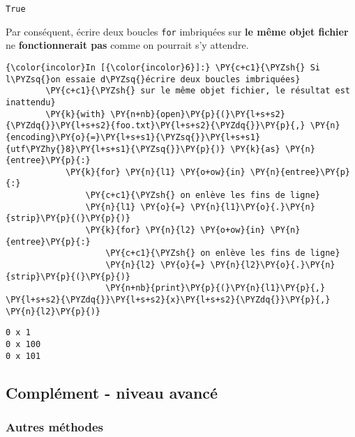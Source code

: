     \begin{Verbatim}[commandchars=\\\{\},frame=single,framerule=0.3mm,rulecolor=\color{cellframecolor}]
True
\end{Verbatim}

    Par conséquent, écrire deux boucles \texttt{for} imbriquées sur
\textbf{le même objet fichier} ne \textbf{fonctionnerait pas} comme on
pourrait s'y attendre.

    \begin{Verbatim}[commandchars=\\\{\},frame=single,framerule=0.3mm,rulecolor=\color{cellframecolor}]
{\color{incolor}In [{\color{incolor}6}]:} \PY{c+c1}{\PYZsh{} Si l\PYZsq{}on essaie d\PYZsq{}écrire deux boucles imbriquées}
        \PY{c+c1}{\PYZsh{} sur le même objet fichier, le résultat est inattendu}
        \PY{k}{with} \PY{n+nb}{open}\PY{p}{(}\PY{l+s+s2}{\PYZdq{}}\PY{l+s+s2}{foo.txt}\PY{l+s+s2}{\PYZdq{}}\PY{p}{,} \PY{n}{encoding}\PY{o}{=}\PY{l+s+s1}{\PYZsq{}}\PY{l+s+s1}{utf\PYZhy{}8}\PY{l+s+s1}{\PYZsq{}}\PY{p}{)} \PY{k}{as} \PY{n}{entree}\PY{p}{:}
            \PY{k}{for} \PY{n}{l1} \PY{o+ow}{in} \PY{n}{entree}\PY{p}{:}
                \PY{c+c1}{\PYZsh{} on enlève les fins de ligne}
                \PY{n}{l1} \PY{o}{=} \PY{n}{l1}\PY{o}{.}\PY{n}{strip}\PY{p}{(}\PY{p}{)}
                \PY{k}{for} \PY{n}{l2} \PY{o+ow}{in} \PY{n}{entree}\PY{p}{:}
                    \PY{c+c1}{\PYZsh{} on enlève les fins de ligne}
                    \PY{n}{l2} \PY{o}{=} \PY{n}{l2}\PY{o}{.}\PY{n}{strip}\PY{p}{(}\PY{p}{)}
                    \PY{n+nb}{print}\PY{p}{(}\PY{n}{l1}\PY{p}{,} \PY{l+s+s2}{\PYZdq{}}\PY{l+s+s2}{x}\PY{l+s+s2}{\PYZdq{}}\PY{p}{,} \PY{n}{l2}\PY{p}{)}
\end{Verbatim}


    \begin{Verbatim}[commandchars=\\\{\},frame=single,framerule=0.3mm,rulecolor=\color{cellframecolor}]
0 x 1
0 x 100
0 x 101
\end{Verbatim}

    \hypertarget{compluxe9ment---niveau-avancuxe9}{%
\subsection{Complément - niveau
avancé}\label{compluxe9ment---niveau-avancuxe9}}

    \hypertarget{autres-muxe9thodes}{%
\subsubsection{Autres méthodes}\label{autres-muxe9thodes}}

